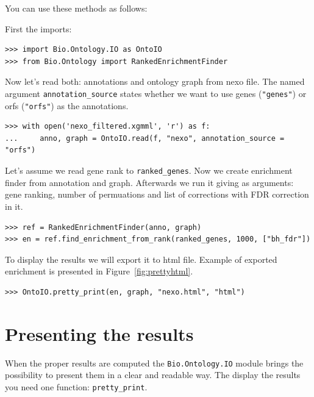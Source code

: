 \documentclass{report}
\begin{document}
You can use these methods as follows:

First the imports:
\begin{verbatim}
>>> import Bio.Ontology.IO as OntoIO
>>> from Bio.Ontology import RankedEnrichmentFinder
\end{verbatim}

Now let's read both: annotations and ontology graph from nexo file. The named
argument \verb|annotation_source| states whether we want to use genes (\verb|"genes"|)
or orfs (\verb|"orfs"|) as the annotations.

\begin{verbatim}
>>> with open('nexo_filtered.xgmml', 'r') as f:
...     anno, graph = OntoIO.read(f, "nexo", annotation_source = "orfs")
\end{verbatim}

Let's assume we read gene rank to \verb|ranked_genes|.
Now we create enrichment finder from annotation and graph. Afterwards we run it
giving as arguments: gene ranking, number of permuations and list of corrections with
FDR correction in it.
\begin{verbatim}
>>> ref = RankedEnrichmentFinder(anno, graph)
>>> en = ref.find_enrichment_from_rank(ranked_genes, 1000, ["bh_fdr"])
\end{verbatim}

To display the results we will export it to html file. Example of exported
enrichment is presented in Figure~\ref{fig:prettyhtml}.
\begin{verbatim}
>>> OntoIO.pretty_print(en, graph, "nexo.html", "html")
\end{verbatim}

\section{Presenting the results}
When the proper results are computed the \verb|Bio.Ontology.IO| module brings
the possibility to present them in a clear and readable way. The display the
results you need one function: \verb|pretty_print|.
\end{document}
